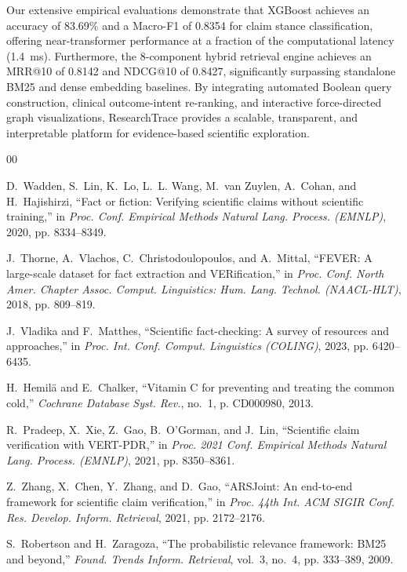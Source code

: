 \documentclass[conference]{IEEEtran}
\begin{document}
Our extensive empirical evaluations demonstrate that XGBoost achieves an accuracy of 83.69\% and a Macro-F1 of 0.8354 for claim stance classification, offering near-transformer performance at a fraction of the computational latency (1.4~ms). Furthermore, the 8-component hybrid retrieval engine achieves an MRR@10 of 0.8142 and NDCG@10 of 0.8427, significantly surpassing standalone BM25 and dense embedding baselines. By integrating automated Boolean query construction, clinical outcome-intent re-ranking, and interactive force-directed graph visualizations, ResearchTrace provides a scalable, transparent, and interpretable platform for evidence-based scientific exploration.

\begin{thebibliography}{00}
\footnotesize

D.~Wadden, S.~Lin, K.~Lo, L.~L. Wang, M.~van Zuylen, A.~Cohan, and H.~Hajishirzi, ``Fact or fiction: Verifying scientific claims without scientific training,'' in \emph{Proc. Conf. Empirical Methods Natural Lang. Process. (EMNLP)}, 2020, pp. 8334--8349.

J.~Thorne, A.~Vlachos, C.~Christodoulopoulos, and A.~Mittal, ``FEVER: A large-scale dataset for fact extraction and VERification,'' in \emph{Proc. Conf. North Amer. Chapter Assoc. Comput. Linguistics: Hum. Lang. Technol. (NAACL-HLT)}, 2018, pp. 809--819.

J.~Vladika and F.~Matthes, ``Scientific fact-checking: A survey of resources and approaches,'' in \emph{Proc. Int. Conf. Comput. Linguistics (COLING)}, 2023, pp. 6420--6435.

H.~Hemil{\"{a}} and E.~Chalker, ``Vitamin C for preventing and treating the common cold,'' \emph{Cochrane Database Syst. Rev.}, no.~1, p. CD000980, 2013.

R.~Pradeep, X.~Xie, Z.~Gao, B.~O'Gorman, and J.~Lin, ``Scientific claim verification with VERT-PDR,'' in \emph{Proc. 2021 Conf. Empirical Methods Natural Lang. Process. (EMNLP)}, 2021, pp. 8350--8361.

Z.~Zhang, X.~Chen, Y.~Zhang, and D.~Gao, ``ARSJoint: An end-to-end framework for scientific claim verification,'' in \emph{Proc. 44th Int. ACM SIGIR Conf. Res. Develop. Inform. Retrieval}, 2021, pp. 2172--2176.

S.~Robertson and H.~Zaragoza, ``The probabilistic relevance framework: BM25 and beyond,'' \emph{Found. Trends Inform. Retrieval}, vol.~3, no.~4, pp. 333--389, 2009.


\end{thebibliography}
\end{document}
